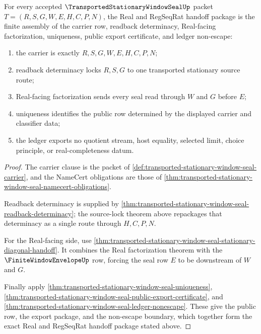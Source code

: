 \begin{theorem}
\label{thm:transported-stationary-window-seal-real-seal-nonescape-package}
For every accepted $\TransportedStationaryWindowSealUp$ packet $T=(R,S,G,W,E,H,C,P,N)$, the Real and RegSeqRat handoff package is the finite assembly of the carrier row, readback determinacy, Real-facing factorization, uniqueness, public export certificate, and ledger non-escape:
\begin{enumerate}
\item the carrier is exactly $R,S,G,W,E,H,C,P,N$;
\item readback determinacy locks $R,S,G$ to one transported stationary source route;
\item Real-facing factorization sends every seal read through $W$ and $G$ before $E$;
\item uniqueness identifies the public row determined by the displayed carrier and classifier data;
\item the ledger exports no quotient stream, host equality, selected limit, choice principle, or real-completeness datum.
\end{enumerate}
\end{theorem}
\begin{proof}
The carrier clause is the packet of \autoref{def:transported-stationary-window-seal-carrier}, and the NameCert obligations are those of \autoref{thm:transported-stationary-window-seal-namecert-obligations}.

Readback determinacy is supplied by \autoref{thm:transported-stationary-window-seal-readback-determinacy}; the source-lock theorem above repackages that determinacy as a single route through $H,C,P,N$.

For the Real-facing side, use \autoref{thm:transported-stationary-window-seal-stationary-diagonal-handoff}. It combines the Real factorization theorem with the $\FiniteWindowEnvelopeUp$ row, forcing the seal row $E$ to be downstream of $W$ and $G$.

Finally apply \autoref{thm:transported-stationary-window-seal-uniqueness}, \autoref{thm:transported-stationary-window-seal-public-export-certificate}, and \autoref{thm:transported-stationary-window-seal-ledger-nonescape}. These give the public row, the export package, and the non-escape boundary, which together form the exact Real and RegSeqRat handoff package stated above.
\end{proof}

